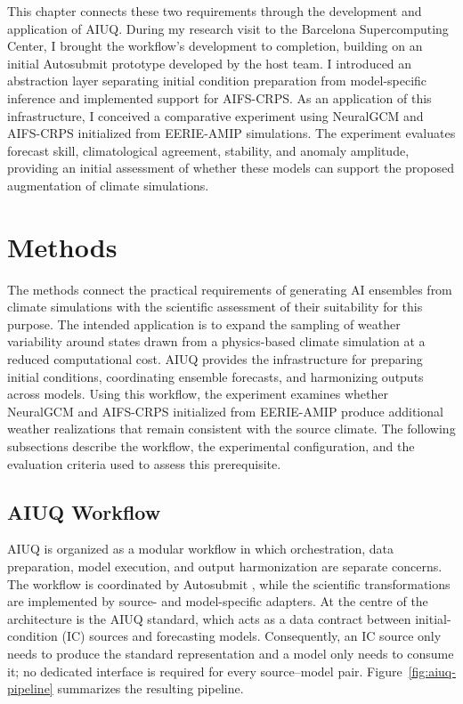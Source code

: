 This chapter connects these two requirements through the development and application of AIUQ. During my research visit to the Barcelona Supercomputing Center, I brought the workflow's development to completion, building on an initial Autosubmit prototype developed by the host team. I introduced an abstraction layer separating initial condition preparation from model-specific inference and implemented support for AIFS-CRPS. As an application of this infrastructure, I conceived a comparative experiment using NeuralGCM and AIFS-CRPS initialized from EERIE-AMIP simulations. The experiment evaluates forecast skill, climatological agreement, stability, and anomaly amplitude, providing an initial assessment of whether these models can support the proposed augmentation of climate simulations.

\section{Methods}

The methods connect the practical requirements of generating AI ensembles from climate simulations with the scientific assessment of their suitability for this purpose. The intended application is to expand the sampling of weather variability around states drawn from a physics-based climate simulation at a reduced computational cost. AIUQ provides the infrastructure for preparing initial conditions, coordinating ensemble forecasts, and harmonizing outputs across models. Using this workflow, the experiment examines whether NeuralGCM and AIFS-CRPS initialized from EERIE-AMIP produce additional weather realizations that remain consistent with the source climate. The following subsections describe the workflow, the experimental configuration, and the evaluation criteria used to assess this prerequisite.

\subsection{AIUQ Workflow} \label{workflow}

AIUQ is organized as a modular workflow in which orchestration, data preparation, model execution, and output harmonization are separate concerns. The workflow is coordinated by Autosubmit \citep{manubens-gil_seamless_2016}, while the scientific transformations are implemented by source- and model-specific adapters. At the centre of the architecture is the AIUQ standard, which acts as a data contract between initial-condition (IC) sources and forecasting models. Consequently, an IC source only needs to produce the standard representation and a model only needs to consume it; no dedicated interface is required for every source--model pair. Figure~\ref{fig:aiuq-pipeline} summarizes the resulting pipeline.

